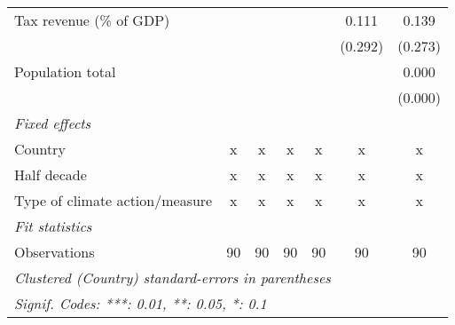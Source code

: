 \begin{tabular}{lcccccc}
   Tax revenue (\% of GDP)                        &               &                  &                   &                   & 0.111             & 0.139\\   
                                                  &               &                  &                   &                   & (0.292)           & (0.273)\\   
   Population total                               &               &                  &                   &                   &                   & 0.000\\   
                                                  &               &                  &                   &                   &                   & (0.000)\\   
   \emph{Fixed effects}\\
   Country                                        & x             & x                & x                 & x                 & x                 & x\\  
   Half decade                                    & x             & x                & x                 & x                 & x                 & x\\  
   Type of climate action/measure                 & x             & x                & x                 & x                 & x                 & x\\  
   \midrule \emph{Fit statistics}\\
   Observations                                   & 90            & 90               & 90                & 90                & 90                & 90\\  
   \midrule
   \multicolumn{7}{l}{\emph{Clustered (Country) standard-errors in parentheses}}\\
   \multicolumn{7}{l}{\emph{Signif. Codes: ***: 0.01, **: 0.05, *: 0.1}}\\
\end{tabular}
\par\endgroup



